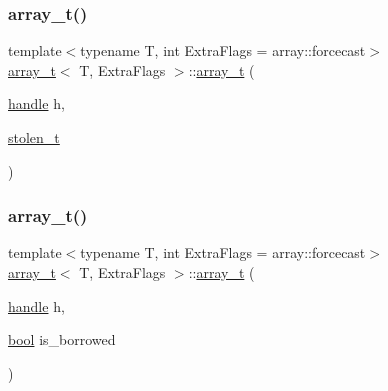 \mbox{\label{classarray__t_a6173d09655f37b338be294b3fb9c5fd6}} 
\subsubsection{\texorpdfstring{array\_t()}{array\_t()}\hspace{0.1cm}{\footnotesize\ttfamily [3/9]}}
{\footnotesize\ttfamily template$<$typename T, int Extra\+Flags = array\+::forcecast$>$ \\
\mbox{\hyperlink{classarray__t}{array\+\_\+t}}$<$ T, Extra\+Flags $>$\+::\mbox{\hyperlink{classarray__t}{array\+\_\+t}} (\begin{DoxyParamCaption}\item[{\mbox{\hyperlink{classhandle}{handle}}}]{h,  }\item[{\mbox{\hyperlink{structobject_1_1stolen__t}{stolen\+\_\+t}}}]{ }\end{DoxyParamCaption})\hspace{0.3cm}{\ttfamily [inline]}}

\mbox{\label{classarray__t_a38d43f3aa5a9f571806c1f16c0d0cdbe}} 
\subsubsection{\texorpdfstring{array\_t()}{array\_t()}\hspace{0.1cm}{\footnotesize\ttfamily [4/9]}}
{\footnotesize\ttfamily template$<$typename T, int Extra\+Flags = array\+::forcecast$>$ \\
\mbox{\hyperlink{classarray__t}{array\+\_\+t}}$<$ T, Extra\+Flags $>$\+::\mbox{\hyperlink{classarray__t}{array\+\_\+t}} (\begin{DoxyParamCaption}\item[{\mbox{\hyperlink{classhandle}{handle}}}]{h,  }\item[{\mbox{\hyperlink{asdl_8h_af6a258d8f3ee5206d682d799316314b1}{bool}}}]{is\+\_\+borrowed }\end{DoxyParamCaption})\hspace{0.3cm}{\ttfamily [inline]}}

